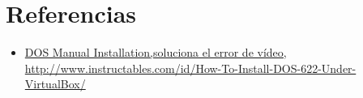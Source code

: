 \documentclass[paper=a4, fontsize=12pt]{article} 		%
\numberwithin{equation}{section}						%
\numberwithin{table}{section} 							%
\begin{document}
\section{Referencias}
\begin{itemize}
\item  \hyperref[http://www.instructables.com/id/How-To-Install-DOS-622-Under-VirtualBox/]{DOS Manual Installation,soluciona el error de vídeo,  http://www.instructables.com/id/How-To-Install-DOS-622-Under-VirtualBox/}
\end{itemize}
\end{document}
